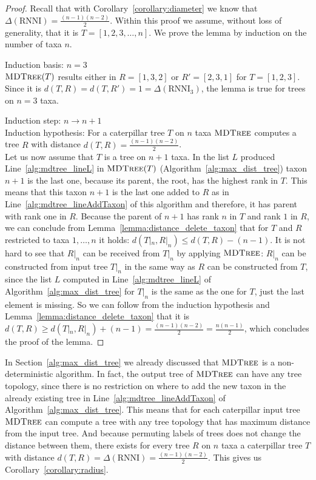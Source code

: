 \documentclass{amsart}
\newcommand{\rnni}{\mathrm{RNNI}}
\newcommand{\mdtree}{\textsc{MDTree}}
\begin{document}
\begin{proof}
    Recall that with Corollary~\ref{corollary:diameter} we know that $\Delta(\rnni) = \frac{(n-1)(n-2)}{2}$.
    Within this proof we assume, without loss of generality, that it is $T = [1,2,3,\ldots,n]$.
    We prove the lemma by induction on the number of taxa $n$.

    Induction basis: $n = 3$\\
    $\mdtree(T)$ results either in $R =[1,3,2]$ or $R'= [2,3,1]$ for $T = [1,2,3]$.
    Since it is $d(T,R) = d(T,R') = 1 = \Delta(\rnni_3)$, the lemma is true for trees on $n=3$ taxa.

    Induction step: $n \to n+1$\\
    Induction hypothesis: For a caterpillar tree $T$ on $n$ taxa $\mdtree$ computes a tree $R$ with distance $d(T,R) = \frac{(n-1)(n-2)}{2}$.\\
    Let us now  assume that $T$ is a tree on $n+1$ taxa.
    In the list $L$ produced Line~\ref{alg:mdtree_lineL} in $\mdtree(T)$ (Algorithm~\ref{alg:max_dist_tree}) taxon $n+1$ is the last one, because its parent, the root, has the highest rank in $T$.
    This means that this taxon $n+1$ is the last one added to $R$ as in Line~\ref{alg:mdtree_lineAddTaxon} of this algorithm and therefore, it has parent with rank one in $R$.
    Because the parent of $n+1$ has rank $n$ in $T$ and rank $1$ in $R$, we can conclude from Lemma~\ref{lemma:distance_delete_taxon} that for $T$ and $R$ restricted to taxa $1,\ldots,n$ it holds: $d(T|_n,R|_n) \leq d(T,R) - (n-1)$.
    It is not hard to see that $R|_n$ can be received from $T|_n$ by applying $\mdtree$:
    $R|_n$ can be constructed from input tree $T|_n$ in the same way as $R$ can be constructed from $T$, since the list $L$ computed in Line~\ref{alg:mdtree_lineL} of Algorithm~\ref{alg:max_dist_tree} for $T|_n$ is the same as the one for $T$, just the last element is missing.
    So we can follow from the induction hypothesis and Lemma~\ref{lemma:distance_delete_taxon} that it is $d(T,R) \geq d(T|_n,R|_n) + (n-1) = \frac{(n-1)(n-2)}{2} = \frac{n(n-1)}{2}$, which concludes the proof of the lemma.
\end{proof}

In Section~\ref{alg:max_dist_tree} we already discussed that $\mdtree$ is a non-deterministic algorithm.
In fact, the output tree of $\mdtree$ can have any tree topology, since there is no restriction on where to add the new taxon in the already existing tree in Line~\ref{alg:mdtree_lineAddTaxon} of Algorithm~\ref{alg:max_dist_tree}.
This means that for each caterpillar input tree $\mdtree$ can compute a tree with any tree topology that has maximum distance from the input tree.
And because permuting labels of trees does not change the distance between them, there exists for every tree $R$ on $n$ taxa a caterpillar tree $T$ with distance $d(T,R) = \Delta(\rnni) = \frac{(n-1)(n-2)}{2}$.
This gives us Corollary~\ref{corollary:radius}.
\end{document}
